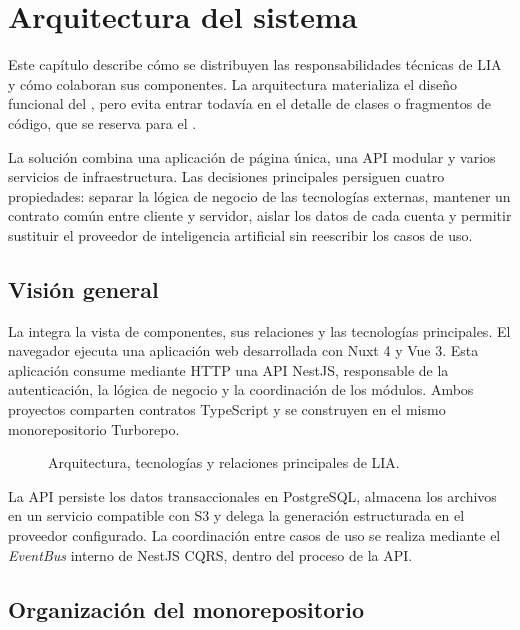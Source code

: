 \chapter{Arquitectura del sistema}
\label{chap:architecture}

Este capítulo describe cómo se distribuyen las responsabilidades técnicas de
LIA y cómo colaboran sus componentes. La arquitectura materializa el diseño
funcional del , pero evita entrar todavía en el
detalle de clases o fragmentos de código, que se reserva para el
.

La solución combina una aplicación de página única, una API modular y varios
servicios de infraestructura. Las decisiones principales persiguen cuatro
propiedades: separar la lógica de negocio de las tecnologías externas,
mantener un contrato común entre cliente y servidor, aislar los datos de cada
cuenta y permitir sustituir el proveedor de inteligencia artificial sin
reescribir los casos de uso.

\section{Visión general}

La  integra la vista de componentes, sus
relaciones y las tecnologías principales. El navegador ejecuta una aplicación
web desarrollada con Nuxt 4 y Vue 3. Esta aplicación consume mediante HTTP una
API NestJS, responsable de la autenticación, la lógica de negocio y la
coordinación de los módulos. Ambos proyectos comparten contratos TypeScript y
se construyen en el mismo monorepositorio Turborepo.

\begin{figure}[htbp]
  \centering
  \resizebox{\textwidth}{!}{
    
  }
  \caption{Arquitectura, tecnologías y relaciones principales de LIA.}
  \label{fig:system-architecture}
\end{figure}

La API persiste los datos transaccionales en PostgreSQL, almacena los archivos
en un servicio compatible con S3 y delega la generación estructurada en el
proveedor configurado. La coordinación entre casos de uso se realiza mediante
el \emph{EventBus} interno de NestJS CQRS, dentro del proceso de la API.

\section{Organización del monorepositorio}
\label{sec:monorepo-architecture}

